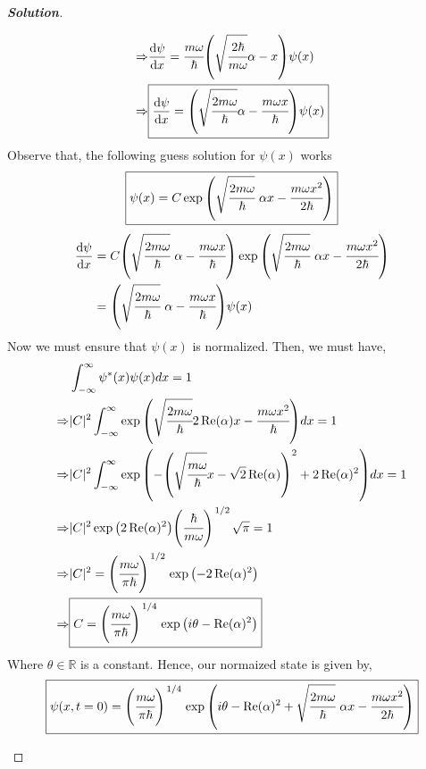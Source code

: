 \documentclass[10pt]{scrartcl}
\theoremstyle{definition}
\newenvironment{solution} {\begin{proof}[\normalfont \textbf{Solution}]} {\end{proof}}
\newcommand{\rn}{\mathbb{R}}
\begin{document}
\begin{solution}
\begin{enumerate}[label=(\alph*)]
\begin{align*}
                \Rightarrow &\dv{\psi}{x} = \cfrac{m\omega}{\hbar}\qty(\sqrt{\cfrac{2\hbar}{m\omega}}\alpha - x)\psi(x) \\
                \Rightarrow &\boxed{\dv{\psi}{x} = \qty(\sqrt{\cfrac{2m\omega}{\hbar}}\alpha - \cfrac{m\omega x}{\hbar})\psi(x)} \\
            \end{align*}
            Observe that, the following guess solution for $\psi(x)$ works
            $$\boxed{\psi(x) = C\exp\qty(\sqrt{\cfrac{2m\omega}{\hbar}}~\alpha x - \cfrac{m\omega x^2}{2\hbar})}$$
            \begin{align*}
                \dv{\psi}{x} &= C\qty(\sqrt{\cfrac{2m\omega}{\hbar}}~\alpha - \cfrac{m\omega x}{\hbar}) \exp\qty(\sqrt{\cfrac{2m\omega}{\hbar}}~\alpha x - \cfrac{m\omega x^2}{2\hbar}) \\ 
                             &= \qty(\sqrt{\cfrac{2m\omega}{\hbar}}~\alpha - \cfrac{m\omega x}{\hbar})\psi(x)
            \end{align*}
            Now we must ensure that $\psi(x)$ is normalized. Then, we must have, 
            \begin{align*}
                &\int_{-\infty}^\infty \psi^*(x)\psi(x)dx = 1 \\ 
                \Rightarrow &|C|^2 \int_{-\infty}^\infty \exp\qty(\sqrt{\cfrac{2m\omega}{\hbar}}2\Re(\alpha)x - \cfrac{m\omega x^2}{\hbar} )dx  = 1\\ 
                \Rightarrow &|C|^2 \int_{-\infty}^\infty \exp\qty(-\qty(\sqrt{\cfrac{m\omega}{\hbar}}x - \sqrt 2\Re(\alpha))^2 + 2\Re(\alpha)^2)dx  = 1\\ 
                \Rightarrow &|C|^2 \exp\qty(2\Re(\alpha)^2) \qty(\cfrac{\hbar}{m\omega})^{\flatfrac{1}{2}} \sqrt\pi = 1 \\
                \Rightarrow &|C|^2 = \qty(\cfrac{m\omega}{\pi\hbar})^{\flatfrac{1}{2}} \exp\qty(-2\Re(\alpha)^2) \\
                \Rightarrow &\boxed{C = \qty(\cfrac{m\omega}{\pi\hbar})^{\flatfrac{1}{4}} \exp\qty(i\theta -\Re(\alpha)^2)}
            \end{align*}
            Where $\theta \in \rn$ is a constant. Hence, our normaized state is given by, 
            $$\boxed{\psi(x, t=0) = \qty(\cfrac{m\omega}{\pi\hbar})^{\flatfrac{1}{4}}\exp\qty(i\theta -\Re(\alpha)^2 + \sqrt{\cfrac{2m\omega}{\hbar}}~\alpha x - \cfrac{m\omega x^2}{2\hbar})}$$
    \end{enumerate}
\end{solution}
\end{document}
